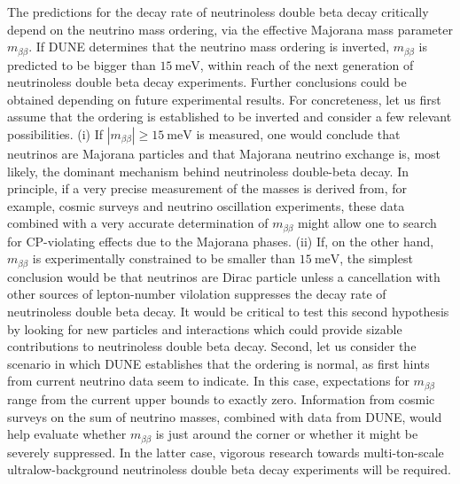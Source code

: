 The predictions for the decay rate of neutrinoless double beta decay critically depend on the neutrino mass ordering, via the effective Majorana mass parameter $m_{\beta \beta}$. If DUNE determines that the neutrino mass ordering is inverted, $m_{\beta \beta}$ is predicted to be bigger than $15~\mathrm{meV}$, within reach of the next generation of neutrinoless double beta decay experiments. Further conclusions could be obtained depending on future experimental results. For concreteness, let us first assume that the ordering is established to be inverted and consider a few relevant possibilities. (i) If  $|m_{\beta \beta}| \geq 15~\mathrm{meV}$ is measured, one would conclude that neutrinos are Majorana particles and that Majorana neutrino exchange is, most likely, the dominant mechanism behind neutrinoless double-beta decay. In principle, if a very precise measurement of the masses is derived from, for example, cosmic surveys and neutrino oscillation experiments, these data combined with a very accurate determination of $m_{\beta \beta}$ might allow one to search for CP-violating effects due to the Majorana phases. (ii) If, on the other hand, $m_{\beta \beta}$ is experimentally constrained to be smaller than  $15~\mathrm{meV}$, the simplest conclusion would be that neutrinos are Dirac particle unless a cancellation with other sources of lepton-number vilolation suppresses the decay rate of neutrinoless double beta decay. It would be critical to test this second hypothesis by looking for new particles and interactions which could provide sizable contributions to neutrinoless double beta decay. Second, let us consider the scenario in which DUNE establishes that the ordering is normal, as first hints from current neutrino data seem to indicate. In this case, expectations for $m_{\beta \beta}$ range from the current upper bounds to exactly zero. Information from cosmic surveys on the sum of neutrino masses, combined with data from DUNE, would help evaluate whether $m_{\beta \beta}$ is just around the corner or whether it might be severely suppressed. In the latter case, vigorous research towards multi-ton-scale ultralow-background neutrinoless double beta decay experiments will be required.  

%

